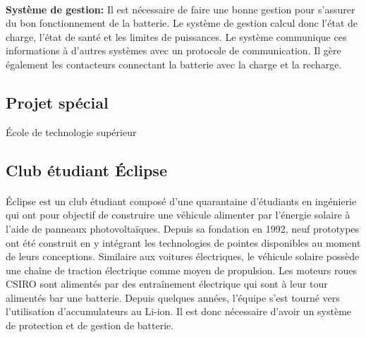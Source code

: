 \paragraph{}
\textbf{Système de gestion:} Il est nécessaire de faire une bonne gestion pour s'assurer du bon fonctionnement de la batterie. Le système de gestion calcul donc l'état de charge, l'état de santé et les limites de puissances. Le système communique ces informations à d'autres systèmes avec un protocole de communication. Il gère également les contacteurs connectant la batterie avec la charge et la recharge.


\subsection{Projet spécial}
École de technologie supérieur

\subsection{Club étudiant Éclipse}

\paragraph{}
Éclipse est un club étudiant composé d'une quarantaine d'étudiants en ingénierie qui ont pour objectif de construire une véhicule alimenter par l'énergie solaire à l'aide de panneaux photovoltaïques. Depuis sa fondation en 1992, neuf prototypes ont été construit en y intégrant les technologies de pointes disponibles au moment de leurs conceptions. Similaire aux voitures électriques, le véhicule solaire possède une chaîne de traction électrique comme moyen de propulsion. Les moteurs roues  CSIRO sont alimentés par des entraînement électrique qui sont à leur tour alimentés bar une batterie. Depuis quelques années, l'équipe s'est tourné vers l'utilisation d'accumulateurs au Li-ion. Il est donc nécessaire d'avoir un système de protection et de gestion de batterie.


